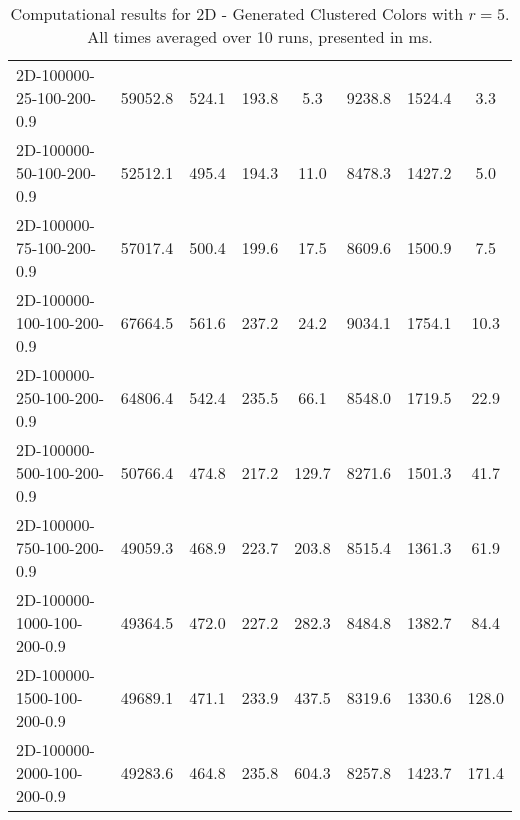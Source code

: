 \documentclass{article}
\begin{document}
\begin{center}
\begin{table}[h]
\begin{tabular}{|l||c|c|c|c|c|c|c|}
    \hline
    2D-100000-25-100-200-0.9 & 59052.8 & 524.1 & 193.8 & 5.3 & 9238.8 & 1524.4 & 3.3 \\
    2D-100000-50-100-200-0.9 & 52512.1 & 495.4 & 194.3 & 11.0 & 8478.3 & 1427.2 & 5.0 \\
    2D-100000-75-100-200-0.9 & 57017.4 & 500.4 & 199.6 & 17.5 & 8609.6 & 1500.9 & 7.5 \\
    2D-100000-100-100-200-0.9 & 67664.5 & 561.6 & 237.2 & 24.2 & 9034.1 & 1754.1 & 10.3 \\
    2D-100000-250-100-200-0.9 & 64806.4 & 542.4 & 235.5 & 66.1 & 8548.0 & 1719.5 & 22.9 \\
    2D-100000-500-100-200-0.9 & 50766.4 & 474.8 & 217.2 & 129.7 & 8271.6 & 1501.3 & 41.7 \\
    2D-100000-750-100-200-0.9 & 49059.3 & 468.9 & 223.7 & 203.8 & 8515.4 & 1361.3 & 61.9 \\
    2D-100000-1000-100-200-0.9 & 49364.5 & 472.0 & 227.2 & 282.3 & 8484.8 & 1382.7 & 84.4 \\
    2D-100000-1500-100-200-0.9 & 49689.1 & 471.1 & 233.9 & 437.5 & 8319.6 & 1330.6 & 128.0 \\
    2D-100000-2000-100-200-0.9 & 49283.6 & 464.8 & 235.8 & 604.3 & 8257.8 & 1423.7 & 171.4 \\
    \hline
    \end{tabular}
    \caption{Computational results for 2D - Generated Clustered Colors with $r=5$. All times averaged over 10 runs, presented in ms.}
\end{table}
\end{center}
\restoregeometry
\end{document}
